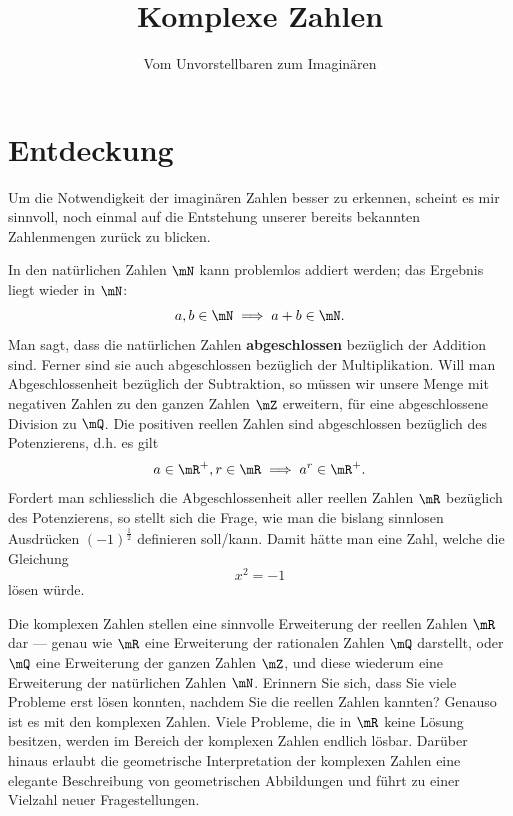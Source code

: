 \documentclass[%
11pt,%
twoside,%
titlepage,%
german,%
headsepline%
]{scrartcl}
\title{Komplexe Zahlen}
\subtitle{Vom Unvorstellbaren zum Imaginären}
\author{}
\date{}
\begin{document}
\maketitle
\thispagestyle{empty}
\cleardoublepage
\tableofcontents
\cleardoublepage

\pagestyle{headings}

\section{Entdeckung}

Um die Notwendigkeit der imaginären Zahlen besser zu erkennen, scheint es mir sinnvoll, noch einmal auf die Entstehung unserer bereits bekannten Zahlenmengen zur\"uck zu blicken.

In den nat\"urlichen Zahlen $\mN$ kann problemlos addiert werden; das Ergebnis liegt wieder in $\mN$:
$$a,b\in\mN\implies a+b\in\mN.$$
Man sagt, dass die nat\"urlichen Zahlen \textbf{abgeschlossen} bez\"uglich der Addition sind. Ferner sind sie auch abgeschlossen bez\"uglich der Multiplikation.
Will man Abgeschlossenheit bez\"uglich der Subtraktion, so m\"ussen wir unsere Menge mit negativen Zahlen zu den ganzen Zahlen $\mZ$ erweitern, f\"ur eine abgeschlossene Division zu $\mQ$. Die positiven reellen Zahlen sind abgeschlossen bez\"uglich des Potenzierens, d.h. es gilt
$$a\in\mR^+,r\in\mR\implies a^r\in\mR^+.$$
Fordert man schliesslich die Abgeschlossenheit aller reellen Zahlen $\mR$ bez\"uglich des Potenzierens, so stellt sich die Frage, wie man die bislang sinnlosen Ausdr\"ucken
$(-1)^{\frac{1}{2}}$
definieren soll/kann. Damit hätte man eine \glqq Zahl\grqq, welche die Gleichung
$$x^2=-1$$
l\"osen w\"urde.

Die
komplexen Zahlen stellen eine sinnvolle Erweiterung der reellen Zahlen $\mR$ dar --- genau wie $\mR$ eine Erweiterung der rationalen Zahlen $\mQ$ darstellt, oder $\mQ$ eine Erweiterung der ganzen Zahlen $\mZ$, und diese wiederum eine Erweiterung der nat\"urlichen Zahlen $\mN$.
Erinnern Sie sich, dass Sie viele Probleme erst l\"osen konnten, nachdem Sie die reellen Zahlen kannten? Genauso ist es mit den komplexen Zahlen. Viele Probleme, die in $\mR$ keine L\"osung besitzen, werden im Bereich der komplexen Zahlen endlich l\"osbar. Dar\"uber hinaus erlaubt die geometrische Interpretation der komplexen Zahlen eine elegante Beschreibung von geometrischen Abbildungen und f\"uhrt zu einer Vielzahl neuer Fragestellungen.

\pagebreak
\end{document}
